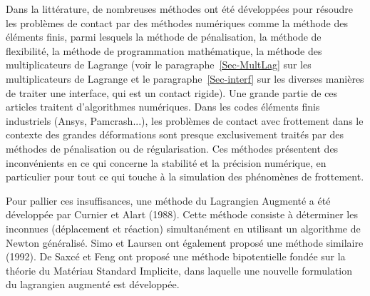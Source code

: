 \medskip
{}

\medskip
Dans la littérature, de nombreuses méthodes ont été développées pour résoudre les problèmes de contact par des méthodes numériques comme la méthode des éléments finis, parmi lesquels la méthode de pénalisation, la méthode de flexibilité, la méthode de programmation mathématique, la méthode des multiplicateurs de Lagrange (voir le paragraphe~\ref{Sec-MultLag} sur les multiplicateurs de Lagrange et le paragraphe~\ref{Sec-interf} sur les diverses manières de traiter une interface, qui est un contact rigide). Une grande partie de ces articles traitent d'algorithmes numériques. Dans les codes éléments finis industriels (Ansys, Pamcrash...), les problèmes de contact avec frottement dans le contexte des grandes déformations sont presque exclusivement traités par des méthodes de pénalisation ou de régularisation. Ces méthodes présentent des inconvénients en ce qui concerne la stabilité et la précision numérique, en particulier pour tout ce qui touche à la simulation des phénomènes de frottement.

\medskip
Pour pallier ces insuffisances, une méthode du Lagrangien Augmenté a été développée par Curnier et Alart (1988). Cette méthode consiste à déterminer les inconnues (déplacement et réaction) simultanément en utilisant un algorithme de Newton généralisé. Simo et Laursen ont également proposé une méthode similaire (1992). De Saxcé et Feng ont proposé une méthode bipotentielle fondée sur la théorie du Matériau Standard Implicite, dans laquelle une nouvelle formulation du lagrangien augmenté est développée.

